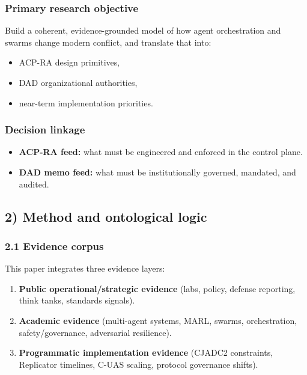 \documentclass[
]{article}
\providecommand{\tightlist}{%
  \setlength{\itemsep}{0pt}\setlength{\parskip}{0pt}}
\begin{document}
\hypertarget{primary-research-objective}{%
\subsubsection{Primary research
objective}\label{primary-research-objective}}

Build a coherent, evidence-grounded model of how agent orchestration and
swarms change modern conflict, and translate that into:

\begin{itemize}
\tightlist
\item
  ACP-RA design primitives,
\item
  DAD organizational authorities,
\item
  near-term implementation priorities.
\end{itemize}

\hypertarget{decision-linkage}{%
\subsubsection{Decision linkage}\label{decision-linkage}}

\begin{itemize}
\tightlist
\item
  \textbf{ACP-RA feed:} what must be engineered and enforced in the
  control plane.
\item
  \textbf{DAD memo feed:} what must be institutionally governed,
  mandated, and audited.
\end{itemize}

\hypertarget{method-and-ontological-logic}{%
\subsection{2) Method and ontological
logic}\label{method-and-ontological-logic}}

\hypertarget{evidence-corpus}{%
\subsubsection{2.1 Evidence corpus}\label{evidence-corpus}}

This paper integrates three evidence layers:

\begin{enumerate}
\def\labelenumi{\arabic{enumi}.}
\tightlist
\item
  \textbf{Public operational/strategic evidence} (labs, policy, defense
  reporting, think tanks, standards signals).
\item
  \textbf{Academic evidence} (multi-agent systems, MARL, swarms,
  orchestration, safety/governance, adversarial resilience).
\item
  \textbf{Programmatic implementation evidence} (CJADC2 constraints,
  Replicator timelines, C-UAS scaling, protocol governance shifts).
\end{enumerate}
\end{document}
